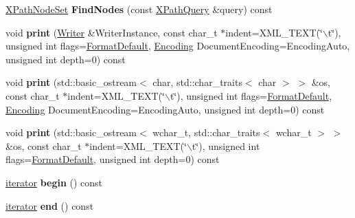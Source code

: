 \begin{DoxyCompactItemize}
\item 
\hypertarget{classphys_1_1xml_1_1Node_a466766bf750da2a04acd8a32d2b8a458}{
\hyperlink{classphys_1_1xml_1_1XPathNodeSet}{XPathNodeSet} {\bfseries FindNodes} (const \hyperlink{classphys_1_1xml_1_1XPathQuery}{XPathQuery} \&query) const }
\label{d7/d0a/classphys_1_1xml_1_1Node_a466766bf750da2a04acd8a32d2b8a458}

\item 
\hypertarget{classphys_1_1xml_1_1Node_a526817671e39653b0dca70c2ba8daa55}{
void {\bfseries print} (\hyperlink{classphys_1_1xml_1_1Writer}{Writer} \&WriterInstance, const char\_\-t $\ast$indent=XML\_\-TEXT(\char`\"{}$\backslash$t\char`\"{}), unsigned int flags=\hyperlink{namespacephys_1_1xml_a08bf6aab51f79929d9097706a5e64408}{FormatDefault}, \hyperlink{namespacephys_1_1xml_a420f5de782438f88160321385bea2015}{Encoding} DocumentEncoding=EncodingAuto, unsigned int depth=0) const }
\label{d7/d0a/classphys_1_1xml_1_1Node_a526817671e39653b0dca70c2ba8daa55}

\item 
\hypertarget{classphys_1_1xml_1_1Node_a99158a08970f0497a3925dddf8227b87}{
void {\bfseries print} (std::basic\_\-ostream$<$ char, std::char\_\-traits$<$ char $>$ $>$ \&os, const char\_\-t $\ast$indent=XML\_\-TEXT(\char`\"{}$\backslash$t\char`\"{}), unsigned int flags=\hyperlink{namespacephys_1_1xml_a08bf6aab51f79929d9097706a5e64408}{FormatDefault}, \hyperlink{namespacephys_1_1xml_a420f5de782438f88160321385bea2015}{Encoding} DocumentEncoding=EncodingAuto, unsigned int depth=0) const }
\label{d7/d0a/classphys_1_1xml_1_1Node_a99158a08970f0497a3925dddf8227b87}

\item 
\hypertarget{classphys_1_1xml_1_1Node_a27b7869e5208547e06b6164bbc68ca0e}{
void {\bfseries print} (std::basic\_\-ostream$<$ wchar\_\-t, std::char\_\-traits$<$ wchar\_\-t $>$ $>$ \&os, const char\_\-t $\ast$indent=XML\_\-TEXT(\char`\"{}$\backslash$t\char`\"{}), unsigned int flags=\hyperlink{namespacephys_1_1xml_a08bf6aab51f79929d9097706a5e64408}{FormatDefault}, unsigned int depth=0) const }
\label{d7/d0a/classphys_1_1xml_1_1Node_a27b7869e5208547e06b6164bbc68ca0e}

\item 
\hypertarget{classphys_1_1xml_1_1Node_a78c82f35dcf7b2c37f1f5ff37d526329}{
\hyperlink{classphys_1_1xml_1_1NodeIterator}{iterator} {\bfseries begin} () const }
\label{d7/d0a/classphys_1_1xml_1_1Node_a78c82f35dcf7b2c37f1f5ff37d526329}

\item 
\hypertarget{classphys_1_1xml_1_1Node_ae69ca8be6e9eb53a4faf8bb50a2996d6}{
\hyperlink{classphys_1_1xml_1_1NodeIterator}{iterator} {\bfseries end} () const }
\label{d7/d0a/classphys_1_1xml_1_1Node_ae69ca8be6e9eb53a4faf8bb50a2996d6}


\end{DoxyCompactItemize}
